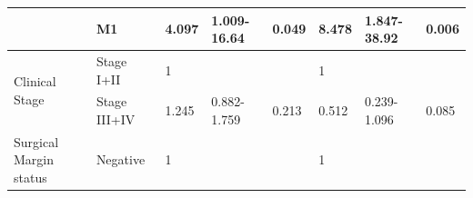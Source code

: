 \documentclass[jpm,article,submit,moreauthors,pdftex]{Definitions/mdpi}
\begin{document}
\begin{table}[!hp]
{\begin{tabular}{|l|l|l|l|l|l|l|l|}
\cline{2-8}
                                        & M1                                                                                  & 4.097                                                                          & 1.009-16.64                                                                   & \textcolor[rgb]{1,0.149,0}{0.049}                                             & 8.478                                                                          & 1.847-38.92                                                                   & \textcolor[rgb]{1,0.149,0}{0.006}                                              \\ 
\hline
\multirow{2}{*}{Clinical Stage}         & {\cellcolor[rgb]{0.62,0.812,0.878}}Stage I+II                                       & {\cellcolor[rgb]{0.62,0.812,0.878}}1                                           & {\cellcolor[rgb]{0.62,0.812,0.878}}                                           & {\cellcolor[rgb]{0.62,0.812,0.878}}                                           & {\cellcolor[rgb]{0.62,0.812,0.878}}1                                           & {\cellcolor[rgb]{0.62,0.812,0.878}}                                           & {\cellcolor[rgb]{0.62,0.812,0.878}}                                            \\ 
\cline{2-8}
                                        & Stage III+IV                                                                        & 1.245                                                                          & 0.882-1.759                                                                   & 0.213                                                                         & 0.512                                                                          & 0.239-1.096                                                                   & 0.085                                                                          \\ 
\hline
\multirow{2}{*}{Surgical Margin status} & {\cellcolor[rgb]{0.62,0.812,0.878}}Negative                                         & {\cellcolor[rgb]{0.62,0.812,0.878}}1                                           & {\cellcolor[rgb]{0.62,0.812,0.878}}                                           & {\cellcolor[rgb]{0.62,0.812,0.878}}                                           & {\cellcolor[rgb]{0.62,0.812,0.878}}1                                           & {\cellcolor[rgb]{0.62,0.812,0.878}}                                           & {\cellcolor[rgb]{0.62,0.812,0.878}}                                            \\ 

\end{tabular}}
\end{table}
\end{document}
